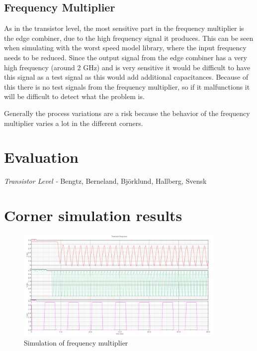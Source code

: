 \documentclass[a4paper,12pt]{article} \usepackage{graphicx}
\begin{document}
\subsection{Frequency Multiplier}
As in the transistor level, the most sensitive part in the frequency
multiplier is the edge combiner, due to the high frequency signal it produces.
This can be seen when simulating with the worst speed model library, where the
input frequency needs to be reduced. Since the output signal from the edge
combiner has a very high frequency (around 2 GHz) and is very sensitive it would
be difficult to have this signal as a test signal as this would add additional
capacitances. Because of this there is no test signals from the frequency
multiplier, so if it malfunctions it will be difficult to detect what the
problem is.

Generally the process variations are a risk because the behavior of the
frequency multiplier varies a lot in the different corners.


\section{Evaluation}


\newpage
\appendix 
\newpage

\begin{thebibliography}{99}
        \textit{Transistor Level - }
                Bengtz, Berneland, Björklund, Hallberg, Svensk \\

\end{thebibliography}

\newpage
\section{Corner simulation results}
\label{sec:corners}

\begin{figure}[h]
        \centering
        \includegraphics[width=0.9\textwidth]{../Bilder/freq_mult_layout_sim.png}
        \caption{Simulation of frequency multiplier}
        \label{fig:freq_mult_sim}
\end{figure}
\end{document}
